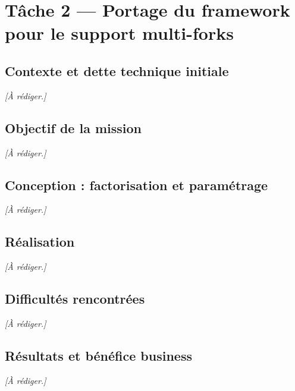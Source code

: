 \chapter{Tâche 2 — Portage du framework pour le support multi-forks}
\label{chap:t2}

\section{Contexte et dette technique initiale}
\emph{[À rédiger.]}

\section{Objectif de la mission}
\emph{[À rédiger.]}

\section{Conception : factorisation et paramétrage}
\emph{[À rédiger.]}

\section{Réalisation}
\emph{[À rédiger.]}

\section{Difficultés rencontrées}
\emph{[À rédiger.]}

\section{Résultats et bénéfice business}
\emph{[À rédiger.]}
